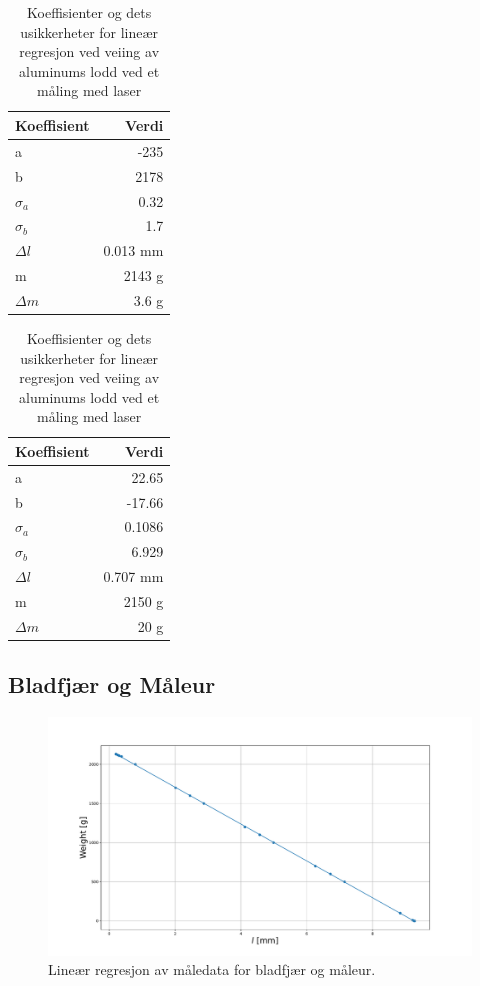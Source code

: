 \documentclass[reprint,norsk,notitlepage]{revtex4-2}
\begin{document}
\begin{table}[!ht]
  \begin{minipage}[t]{.45\linewidth}
    \begin{tabular}[t]{l | r}
    \toprule
    Koeffisient &Verdi \\  
    \midrule
    a &-235 \\  
    b &2178 \\  
    $σ_a$ &0.32 \\  
    $σ_b$ &1.7 \\
    $Δl$ &0.013 mm \\
    m &2143 g \\ 
    $Δm$ &3.6 g \\
    \bottomrule
    \end{tabular}
    \caption{Koeffisienter og dets usikkerheter for lineær regresjon ved veiing av aluminums lodd ved et måling med måleur}
    \label{tab: linear regression coefficients maaleur}
  \end{minipage}
  \begin{minipage}[t]{.45\linewidth}
    \begin{tabular}[t]{l | r}
    \toprule
    Koeffisient &Verdi \\  
    \midrule
    a &22.65 \\  
    b &-17.66 \\  
    $σ_a$ &0.1086 \\  
    $σ_b$ &6.929 \\  
    $Δl$ &0.707 mm \\
    m &2150 g \\ 
    $Δm$ &20 g \\
    \bottomrule
    \end{tabular}
    \caption{Koeffisienter og dets usikkerheter for lineær regresjon ved veiing av aluminums lodd ved et måling med laser}
    \label{tab: linear regression coefficients laser}
  \end{minipage}
\end{table}

\newpage
\subsection{Bladfjær og Måleur}
\begin{figure}[!ht]
  \centering
  \includegraphics[width = .48\textwidth]{fig/linreg_maaleur.pdf}
  \caption{Lineær regresjon av måledata for bladfjær og måleur.}
  \label{fig: linreg maaleur}
\end{figure}
\end{document}
